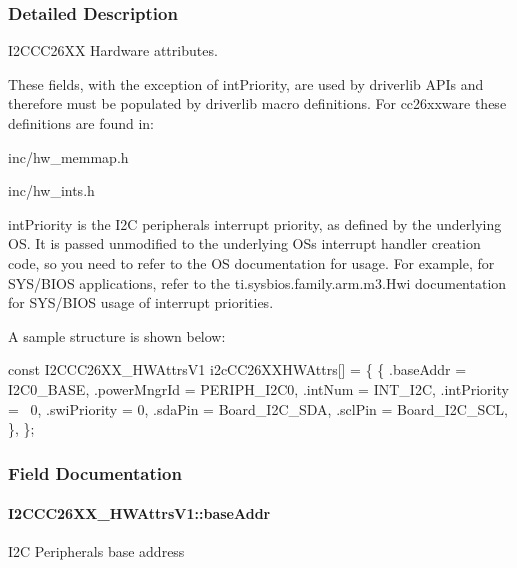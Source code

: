\subsubsection{Detailed Description}
I2\+C\+C\+C26\+X\+X Hardware attributes. 

These fields, with the exception of int\+Priority, are used by driverlib A\+P\+Is and therefore must be populated by driverlib macro definitions. For cc26xxware these definitions are found in\+:
\begin{DoxyItemize}
\item inc/hw\+\_\+memmap.\+h
\item inc/hw\+\_\+ints.\+h
\end{DoxyItemize}

int\+Priority is the I2\+C peripheral\textquotesingle{}s interrupt priority, as defined by the underlying O\+S. It is passed unmodified to the underlying O\+S\textquotesingle{}s interrupt handler creation code, so you need to refer to the O\+S documentation for usage. For example, for S\+Y\+S/\+B\+I\+O\+S applications, refer to the ti.\+sysbios.\+family.\+arm.\+m3.\+Hwi documentation for S\+Y\+S/\+B\+I\+O\+S usage of interrupt priorities.

A sample structure is shown below\+: 
\begin{DoxyCode}
\textcolor{keyword}{const} I2CCC26XX_HWAttrsV1 i2cCC26XXHWAttrs[] = \{
    \{
       .baseAddr = I2C0\_BASE,
       .powerMngrId = PERIPH\_I2C0,
       .intNum = INT\_I2C,
       .intPriority = ~0,
       .swiPriority = 0,
       .sdaPin = Board\_I2C\_SDA,
       .sclPin = Board\_I2C\_SCL,
    \},
\};
\end{DoxyCode}
 

\subsubsection{Field Documentation}
\paragraph[{base\+Addr}]{ I2\+C\+C\+C26\+X\+X\+\_\+\+H\+W\+Attrs\+V1\+::base\+Addr}\label{struct_i2_c_c_c26_x_x___h_w_attrs_v1_a1dcaf2c98df0688a137d6d36fcf5b813}
I2\+C Peripheral\textquotesingle{}s base address 

